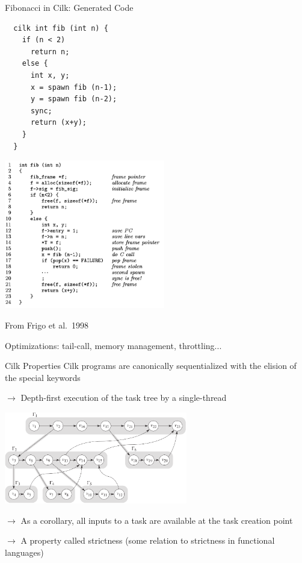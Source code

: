 \documentclass[xcolor=dvipsnames,9pt,mathserif]{beamer}
\begin{document}
\begin{frame}[fragile]{Fibonacci in Cilk: Generated Code}
  \begin{minipage}{4cm}
    \begin{lstlisting}
  cilk int fib (int n) {
    if (n < 2)
      return n;
    else {
      int x, y;
      x = spawn fib (n-1);
      y = spawn fib (n-2);
      sync;
      return (x+y);
    }
  }
    \end{lstlisting}
  \end{minipage}
  \hfill
  \begin{minipage}{7cm}
    \includegraphics[width=7cm]{fib_cilk_generated}

    {\footnotesize From Frigo et al.\ 1998}
  \end{minipage}

  \medskip
  Optimizations: tail-call, memory management, throttling...
\end{frame}

\begin{frame}{Cilk Properties}
  Cilk programs are canonically sequentialized with the elision of the
  special keywords
  
  $\to$ Depth-first execution of the task tree by a single-thread

  \medskip
  \centerline{\includegraphics[width=8cm]{cilk_dag}}

  \bigskip
  $\to$ As a corollary, all inputs to a task are available at the
  task creation point
  
  $\to$ A property called strictness (some relation to
  strictness in functional languages)
\end{frame}
  
\end{document}
